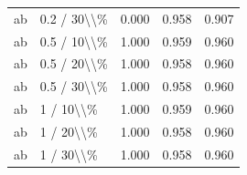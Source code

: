 \begin{table}[!h]
\begin{tabular}[t]{llccc}
\addlinespace
ab & 0.2 / 30\textbackslash{}\textbackslash{}\% & 0.000 & 0.958 & 0.907\\
ab & 0.5 / 10\textbackslash{}\textbackslash{}\% & 1.000 & 0.959 & 0.960\\
ab & 0.5 / 20\textbackslash{}\textbackslash{}\% & 1.000 & 0.958 & 0.960\\
ab & 0.5 / 30\textbackslash{}\textbackslash{}\% & 1.000 & 0.958 & 0.960\\
ab & 1 / 10\textbackslash{}\textbackslash{}\% & 1.000 & 0.959 & 0.960\\
\addlinespace
ab & 1 / 20\textbackslash{}\textbackslash{}\% & 1.000 & 0.958 & 0.960\\
ab & 1 / 30\textbackslash{}\textbackslash{}\% & 1.000 & 0.958 & 0.960\\
\bottomrule
\end{tabular}
\end{table}
